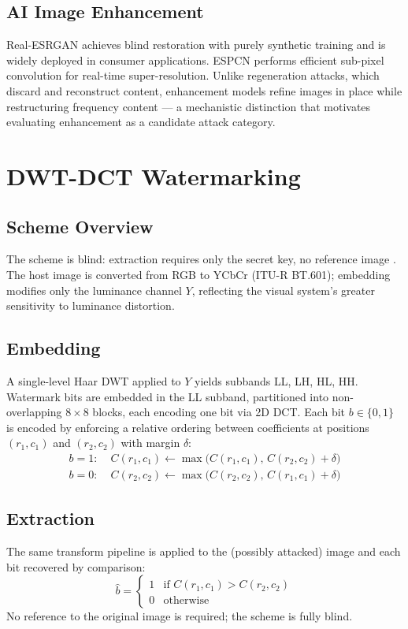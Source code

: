 \documentclass[conference]{IEEEtran}
\begin{document}
\subsection{AI Image Enhancement}
Real-ESRGAN \cite{realesrgan2021} achieves blind restoration with purely
synthetic training and is widely deployed in consumer applications. ESPCN
\cite{espcn2016} performs efficient sub-pixel convolution for real-time
super-resolution. Unlike regeneration attacks, which discard and
reconstruct content, enhancement models refine images in place while
restructuring frequency content --- a mechanistic distinction that
motivates evaluating enhancement as a candidate attack category.

\section{DWT-DCT Watermarking}
\label{sec:background}

\subsection{Scheme Overview}
The scheme is blind: extraction requires only the secret key, no
reference image \cite{cox2007}. The host image is converted from RGB to
YCbCr (ITU-R BT.601); embedding modifies only the luminance channel $Y$,
reflecting the visual system's greater sensitivity to luminance distortion.

\subsection{Embedding}
A single-level Haar DWT applied to $Y$ yields subbands LL, LH, HL, HH.
Watermark bits are embedded in the LL subband, partitioned into
non-overlapping $8\times8$ blocks, each encoding one bit via 2D DCT.
Each bit $b \in \{0,1\}$ is encoded by enforcing a relative ordering
between coefficients at positions $(r_1,c_1)$ and $(r_2,c_2)$ with
margin $\delta$:
\begin{align}
b=1:\; & C(r_1,c_1) \leftarrow \max\!\big(C(r_1,c_1),\, C(r_2,c_2)+\delta\big) \\
b=0:\; & C(r_2,c_2) \leftarrow \max\!\big(C(r_2,c_2),\, C(r_1,c_1)+\delta\big)
\end{align}

\subsection{Extraction}
The same transform pipeline is applied to the (possibly attacked) image
and each bit recovered by comparison:
\begin{equation}
\hat{b} =
\begin{cases}
1 & \text{if } C(r_1,c_1) > C(r_2,c_2) \\
0 & \text{otherwise}
\end{cases}
\end{equation}
No reference to the original image is required; the scheme is fully blind.
\end{document}
